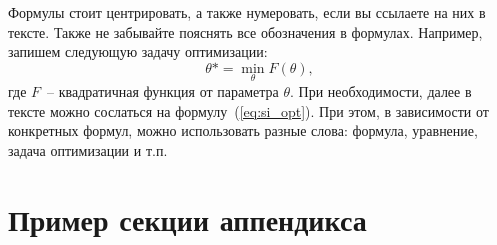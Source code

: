 \documentclass[a4paper,12pt]{extarticle}
\begin{document}
Формулы стоит центрировать, а также нумеровать, если вы ссылаете на них в тексте. Также не забывайте пояснять все обозначения в формулах. Например, запишем следующую задачу оптимизации:
\begin{equation}
    \label{eq:si_opt}
        \theta* = \min_{\theta} F(\theta),
\end{equation}
где $F$~-- квадратичная функция от параметра $\theta$. При необходимости, далее в тексте можно сослаться на формулу~(\ref{eq:si_opt}). При этом, в зависимости от конкретных формул, можно использовать разные слова: формула, уравнение, задача оптимизации и т.п.


	
\newpage 
\printbibliography[heading=bibintoc] 


\newpage
\appendix

\section{Пример секции аппендикса}
\end{document}
